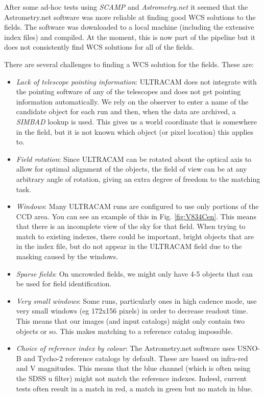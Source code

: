 After some ad-hoc tests using \emph{SCAMP \cite{scamp}} and \emph{Astrometry.net \cite{astrometry}} it seemed that the Astrometry.net software was more reliable at finding good WCS solutions to the fields. The software was downloaded to a local machine (including the extensive index files) and compiled. At the moment, this is now part of the pipeline but it does not consistently find WCS solutions for all of the fields. 

There are several challenges to finding a WCS solution for the fields.  These are:

\begin{itemize}
	\item \emph{Lack of telescope pointing information}: ULTRACAM does not integrate with the pointing software of any of the telescopes and does not get pointing information automatically. We rely on the observer to enter a name of the candidate object for each run and then, when the data are archived, a \emph{SIMBAD} lookup is used. This gives us a world coordinate that is somewhere in the field, but it is not known which object (or pixel location) this applies to.  
	\item \emph{Field rotation}: Since ULTRACAM can be rotated about the optical axis to allow for optimal alignment of the objects, the field of view can be at any arbitrary angle of rotation, giving an extra degree of freedom to the matching task. 
	\item \emph{Windows}: Many ULTRACAM runs are configured to use only portions of the CCD area. You can see an example of this in Fig.  \ref{fig:V834Cen}. This means that there is an incomplete view of the sky for that field. When trying to match to existing indexes, there could be important, bright objects that are in the index file, but do not appear in the ULTRACAM field due to the masking caused by the windows.
	\item \emph{Sparse fields}: On uncrowded fields, we might only have 4-5 objects that can be used for field identification. 
	\item \emph{Very small windows}: Some runs, particularly ones in high cadence mode, use very small windows (eg 172x156 pixels) in order to decrease readout time. This means that our images (and input catalogs) might only contain two objects or so. This makes matching to a reference catalog impossible. 
	\item \emph{Choice of reference index by colour}: The Astrometry.net software uses USNO-B and Tycho-2 reference catalogs by default. These are based on infra-red and V magnitudes. This means that the blue channel (which is often using the SDSS u filter) might not match the reference indexes. Indeed, current tests often result in a match in red, a match in green but no match in blue. 
\end{itemize}

